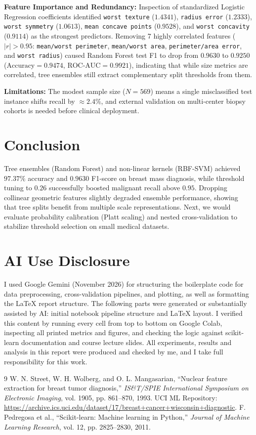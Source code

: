 \documentclass[10pt,twocolumn,a4paper]{IEEEtran}
\begin{document}
\textbf{Feature Importance and Redundancy:} Inspection of standardized Logistic Regression coefficients identified \texttt{worst texture} ($1.4341$), \texttt{radius error} ($1.2333$), \texttt{worst symmetry} ($1.0613$), \texttt{mean concave points} ($0.9528$), and \texttt{worst concavity} ($0.9114$) as the strongest predictors. Removing 7 highly correlated features ($|r| > 0.95$: \texttt{mean/worst perimeter}, \texttt{mean/worst area}, \texttt{perimeter/area error}, and \texttt{worst radius}) caused Random Forest test F1 to drop from $0.9630$ to $0.9250$ ($\text{Accuracy}=0.9474$, $\text{ROC-AUC}=0.9921$), indicating that while size metrics are correlated, tree ensembles still extract complementary split thresholds from them.

\textbf{Limitations:} The modest sample size ($N=569$) means a single misclassified test instance shifts recall by $\approx 2.4\%$, and external validation on multi-center biopsy cohorts is needed before clinical deployment.

\section{Conclusion}
Tree ensembles (Random Forest) and non-linear kernels (RBF-SVM) achieved $97.37\%$ accuracy and $0.9630$ F1-score on breast mass diagnosis, while threshold tuning to $0.26$ successfully boosted malignant recall above $0.95$. Dropping collinear geometric features slightly degraded ensemble performance, showing that tree splits benefit from multiple scale representations. Next, we would evaluate probability calibration (Platt scaling) and nested cross-validation to stabilize threshold selection on small medical datasets.

\section*{AI Use Disclosure}
I used Google Gemini (November 2026) for structuring the boilerplate code for data preprocessing, cross-validation pipelines, and plotting, as well as formatting the LaTeX report structure. The following parts were generated or substantially assisted by AI: initial notebook pipeline structure and LaTeX layout. I verified this content by running every cell from top to bottom on Google Colab, inspecting all printed metrics and figures, and checking the logic against scikit-learn documentation and course lecture slides. All experiments, results and analysis in this report were produced and checked by me, and I take full responsibility for this work.

\begin{thebibliography}{9}
W. N. Street, W. H. Wolberg, and O. L. Mangasarian, ``Nuclear feature extraction for breast tumor diagnosis,'' \textit{IS\&T/SPIE International Symposium on Electronic Imaging}, vol. 1905, pp. 861--870, 1993. UCI ML Repository: \url{https://archive.ics.uci.edu/dataset/17/breast+cancer+wisconsin+diagnostic}.
F. Pedregosa et al., ``Scikit-learn: Machine learning in Python,'' \textit{Journal of Machine Learning Research}, vol. 12, pp. 2825--2830, 2011.
\end{thebibliography}
\end{document}
